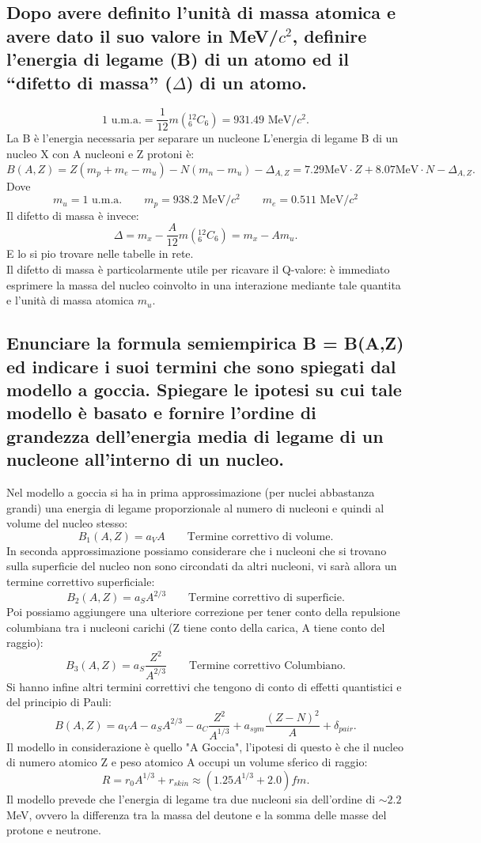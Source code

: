 \subsection[]{ Dopo avere definito l’unità di massa atomica e avere dato il suo valore in MeV/$c^2$, definire l’energia di legame (B) di un atomo ed il “difetto di massa” ($\Delta$) di un atomo.}
\[
	\text{1 u.m.a.} = \frac{1}{12}m\left( {}^{12}_{6}C_{6} \right) = 931.49 \text{ MeV/}c^2 
.\]
La B è l'energia necessaria per separare un nucleone 
L'energia di legame B di un nucleo X con A nucleoni e Z protoni è:
\[
	B\left( A, Z \right) = Z\left( m_p + m_e - m_u \right) - N \left( m_n - m_u \right) - \Delta_{A, Z} = 7.29 \text{MeV} \cdot Z + 8.07 \text{MeV} \cdot N - \Delta_{A,Z} 
.\] 
Dove 
\[
	m_u = 1 \text{ u.m.a.}\quad \quad 
	m_p = 938.2 \text{ MeV/}c^2\quad \quad 
	m_e = 0.511 \text{ MeV/}c^2
\]
Il difetto di massa è invece:
\[
	\Delta = m_{x} - \frac{A}{12}m\left( {}^{12}_{6}C_{6} \right) = m_x - Am_u 
.\] 
E lo si pio trovare nelle tabelle in rete.\\
Il difetto di massa è particolarmente utile per ricavare il Q-valore: è immediato esprimere la massa del nucleo coinvolto in una interazione mediante tale quantita e l'unità di massa atomica $m_u$.

\subsection[]{ Enunciare la formula semiempirica B = B(A,Z) ed indicare i suoi termini che sono spiegati dal modello a goccia. Spiegare le ipotesi su cui tale modello è basato e
fornire l'ordine di grandezza dell’energia media di legame di un nucleone all’interno di un nucleo.}
Nel modello a goccia si ha in prima approssimazione (per nuclei abbastanza grandi) una energia di legame proporzionale al numero di nucleoni e quindi al volume del nucleo stesso:
\[
	B_1\left( A, Z \right) = a_V A \quad \quad \text{Termine correttivo di volume}
.\] 
In seconda approssimazione possiamo considerare che i nucleoni che si trovano sulla superficie del nucleo non sono circondati da altri nucleoni, vi sarà allora un termine correttivo superficiale:
\[
	B_2\left( A,Z \right) = a_S A^{2/3} \quad \quad \text{Termine correttivo di superficie} 
.\] 
Poi possiamo aggiungere una ulteriore correzione per tener conto della repulsione columbiana tra i nucleoni carichi (Z tiene conto della carica, A tiene conto del raggio):
\[
	B_3\left( A,Z \right) = a_S \frac{Z^2}{A^{2/3}} \quad \quad \text{Termine correttivo Columbiano}
.\] 
Si hanno infine altri termini correttivi che tengono di conto di effetti quantistici e del principio di Pauli:
\[
	B\left( A,Z \right) = a_{V}A - a_{S}A^{2/3} - a_{C} \frac{Z^2 }{A^{1/3}} + a_{sym}\frac{\left( Z - N \right)^2}{A} + \delta_{pair} 
.\]
Il modello in considerazione è quello "A Goccia", l'ipotesi di questo è che il nucleo di numero atomico Z e peso atomico A occupi un volume sferico di raggio:
\[
	R = r_0 A^{1/3} + r_{skin} \approx \left( 1.25 A^{1/3} + 2.0  \right) fm
.\]
Il modello prevede che l'energia di legame tra due nucleoni sia dell'ordine di $\sim 2.2$ MeV, ovvero la differenza tra la massa del deutone e la somma delle masse del protone e neutrone. 

